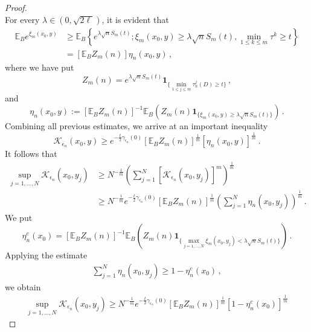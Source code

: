 \documentclass[12pt,reqno]{amsart}
\theoremstyle{remark}
\newcommand{\1}{\mathbf{1}}
\def\EE{\mathbb{E}}
\def\K{\mathcal{K}}
\def\lt{\left}
\def\rt{\right}
\begin{document}
\begin{proof}
\begin{equation*}
		\end{equation*} 
				For every $\lambda\in(0,\sqrt{2\ell})$, it is evident that
		\begin{align*}
			\EE_B e^{\xi_m(x_0,y) }
			&\geq \EE_B \left \{ e^{\lambda \sqrt{n} S_m(t)}; \xi_m(x_0,y)\geq \lambda \sqrt{n} S_m(t), \min_{1\le k\le m} \tau^k\ge t  \right\}
			\\&=[\EE_B Z_m(n)]\eta_n(x_0,y)  \,,
		\end{align*}
		where we have put
		\begin{equation}
			Z_m(n)= e^{\lambda \sqrt{n} S_m(t) } \1 _{\{\min_{1\le j\le m} \tau^j_n(D)\ge t \}}\,,
		\end{equation}
		and
		\begin{equation}
			\eta_n(x_0,y) := \left[ \EE_B Z_m(n) \right]^{-1} \EE_B \left( Z_m(n) \1 _{\{ \xi_m(x_0,y) \ge \lambda \sqrt{n} S_m(t) \}} \right)\,.
		\end{equation}
		Combining all previous estimates, we arrive at an important inequality
		\begin{equation}\label{tmp:KZ}
			\K_{\epsilon_n} (x_0,y)\ge e^{-\frac t2 \gamma_{\epsilon_n}(0)}[\EE_B Z_m(n)]^{\frac1m}[\eta_n(x_0,y)]^{\frac1m}\,.
		\end{equation}
		It follows that
		\begin{align*}
			\sup_{j=1,\dots,N}\K_{\epsilon_n}(x_0,y_j)
			&\ge N^{-\frac1m}\lt(\sum_{j=1}^N [\K_{\epsilon_n}(x_0,y_j)]^m\rt)^{\frac1m}
			\\&\ge N^{-\frac1m}e^{-\frac t2 \gamma_{\epsilon_n}(0)}[\EE_B Z_m(n)]^{\frac1m} \lt(\sum_{j=1}^N\eta_n(x_0,y_j)  \rt)^{\frac1m}\,.
		\end{align*}
		We put
		\begin{equation}\label{eq:eta R}
			\eta^c_n(x_0)=\left[ \EE_B Z_m(n) \right]^{-1} \EE_B \left( Z_m(n) \1 _{\{ \max_{j=1,\dots,N}\xi_m(x_0,y_j) < \lambda \sqrt{n} S_m(t) \}} \right)\,.
		\end{equation}
		Applying the estimate
		\begin{align*}
			\sum_{j=1}^N\eta_n(x_0,y_j) 
			\ge1- \eta^c_n(x_0)\,,
		\end{align*}
		we obtain
		\begin{align}\label{tmp:Keta}
			\sup_{j=1,\dots,N}\K_{\epsilon_n}(x_0,y_j)
			\ge N^{-\frac1m}e^{-\frac t2 \gamma_{\epsilon_n}(0)}[\EE_B Z_m(n)]^{\frac1m} [1- \eta_n^c(x_0)]^{\frac1m}
		\end{align}

\end{proof}
\end{document}
